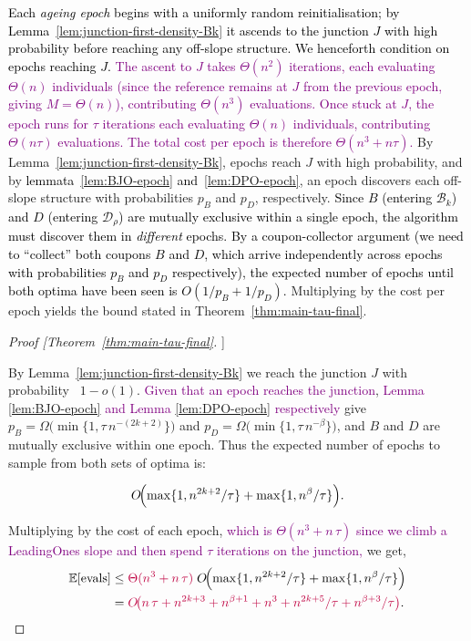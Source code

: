 \documentclass[lettersize,journal]{IEEEtran}
\newcommand{\rerev}[1]{\textcolor{purple}{#1}}
\newcommand{\EE}{\mathbb{E}}
\begin{document}
\textcolor{black}{Each \emph{ageing epoch} begins with a uniformly random reinitialisation; by Lemma~\ref{lem:junction-first-density-Bk} it
ascends to the junction $J$ with high probability before reaching any
off-slope structure.  We henceforth condition on epochs reaching $J$.}
\rerev{The ascent to $J$ takes $\Theta(n^2)$ iterations, each evaluating $\Theta(n)$ individuals (since the reference remains at $J$ from the previous epoch, giving $M=\Theta(n)$), contributing $\Theta(n^3)$ evaluations.  Once stuck at $J$, the epoch runs for $\tau$ iterations each evaluating $\Theta(n)$ individuals, contributing $\Theta(n\tau)$ evaluations.  The total cost per epoch is therefore $\Theta(n^3 + n\tau)$.}
By Lemma~\ref{lem:junction-first-density-Bk}, epochs reach $J$ with high probability, and by \textcolor{black}{lemmata~\ref{lem:BJO-epoch} and~\ref{lem:DPO-epoch}}, an epoch discovers each off-slope structure with probabilities $p_B$ and $p_D$, respectively.
\textcolor{black}{Since $B$ (entering $\mathcal{B}_k$) and $D$ (entering $\mathcal{D}_\rho$) are
mutually exclusive within a single epoch, the algorithm must discover them in
\emph{different} epochs.
By a coupon-collector argument (we need to ``collect'' both coupons $B$ and
$D$, which arrive independently across epochs with probabilities $p_B$ and
$p_D$ respectively), the expected number of epochs until both optima have been seen
is $O(1/p_B + 1/p_D)$.}
Multiplying by the cost per epoch yields the bound stated in Theorem~\ref{thm:main-tau-final}.

\begin{proof}[Proof [Theorem~\ref{thm:main-tau-final}]]

By Lemma~\ref{lem:junction-first-density-Bk} we reach the junction $J$ with probability \ \(1-o(1)\).
	\rerev{Given that an epoch reaches the junction}, \rerev{Lemma \ref{lem:BJO-epoch}  and Lemma \ref{lem:DPO-epoch} respectively} give
$p_B=\Omega\!\bigl(\min\{1,\tau\,n^{-(2k+2)}\}\bigr)$ and
	$p_D=\Omega\!\bigl(\min\{1,\tau\,n^{-\beta}\}\bigr)$,
and \(B\) and \(D\) are mutually exclusive within one epoch. Thus the expected number of epochs to sample from both sets of optima is:
	
\[
O\!\Bigl(
	\max\{1,n^{2k+2}/\tau\}
	+\max\{1,n^{\beta}/\tau\}
	\Bigr).
	\]
	
Multiplying by the cost of each epoch, \rerev{which is $\Theta(n^3+n\,\tau)$ since we climb a LeadingOnes slope and then spend $\tau$ iterations on the junction,} we get,
	\begin{align*}
		\EE[\text{evals}]
		&\le
		\rerev{\Theta(n^3+n\,\tau)}\;
		O\!\Bigl(
		\max\{1,n^{2k+2}/\tau\}
		+\max\{1,n^{\beta}/\tau\}
		\Bigr)
		\\&=
		\rerev{O\!\bigl(
		n\,\tau
		+n^{2k+3}
		+n^{\beta+1}
		+n^3
		+n^{2k+5}/\tau
		+n^{\beta+3}/\tau
		\bigr)}.
	\end{align*}
\end{proof}
\end{document}

